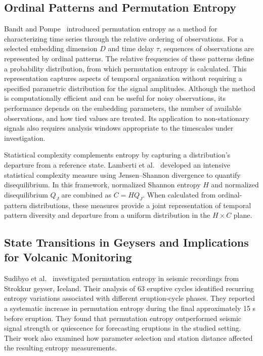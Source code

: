 \documentclass[11pt,a4paper]{article}
\begin{document}
\subsection{Ordinal Patterns and Permutation Entropy}
	
Bandt and Pompe~\cite{Bandt2002} introduced permutation entropy as a method for characterizing time series through the relative ordering of observations. For a selected embedding dimension $D$ and time delay $\tau$, sequences of observations are represented by ordinal patterns. The relative frequencies of these patterns define a probability distribution, from which permutation entropy is calculated. This representation captures aspects of temporal organization without requiring a specified parametric distribution for the signal amplitudes. Although the method is computationally efficient and can be useful for noisy observations, its performance depends on the embedding parameters, the number of available observations, and how tied values are treated. Its application to non-stationary signals also requires analysis windows appropriate to the timescales under investigation.
	
Statistical complexity complements entropy by capturing a distribution's departure from a reference state. Lamberti et al.~\cite{lamberti2004intensive} developed an intensive statistical complexity measure using Jensen--Shannon divergence to quantify disequilibrium. In this framework, normalized Shannon entropy $H$ and normalized disequilibrium $Q_J$ are combined as $C=H Q_J$. When calculated from ordinal-pattern distributions, these measures provide a joint representation of temporal pattern diversity and departure from a uniform distribution in the $H \times C$ plane.
	
\subsection{State Transitions in Geysers and Implications for Volcanic Monitoring}
	
Sudibyo et al.~\cite{Sudibyo2022} investigated permutation entropy in seismic recordings from Strokkur geyser, Iceland. Their analysis of 63 eruptive cycles identified recurring entropy variations associated with different eruption-cycle phases. They reported a systematic increase in permutation entropy during the final approximately 15 s before eruption. They found that permutation entropy outperformed seismic signal strength or quiescence for forecasting eruptions in the studied setting. Their work also examined how parameter selection and station distance affected the resulting entropy measurements.
	
\end{document}
